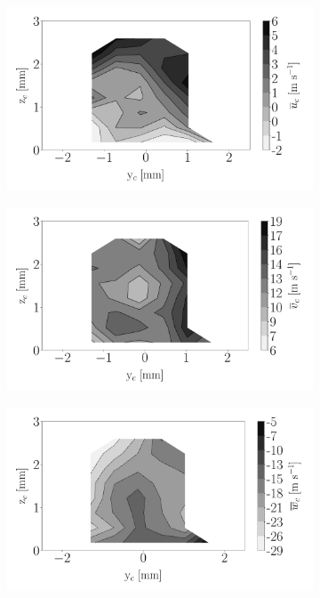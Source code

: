 \begin{figure}[h!]
\begin{subfigure}[b]{0.3\textwidth}
	\centering
   \includegraphics[scale=\scaleSLIBIMER]{./part3_applications/figures_ch8_resolved/injectors_SLI/dx10_xD06p67_ux_mean_map}
\end{subfigure}
   \hspace{0.17in}
\begin{subfigure}[b]{0.3\textwidth}
	\centering
   \includegraphics[scale=\scaleSLIBIMER]{./part3_applications/figures_ch8_resolved/injectors_SLI/dx10_xD06p67_uy_mean_map}
\end{subfigure}
   \hspace{0.17in}
\begin{subfigure}[b]{0.3\textwidth}
	\centering
   \includegraphics[scale=\scaleSLIBIMER]{./part3_applications/figures_ch8_resolved/injectors_SLI/dx10_xD06p67_uz_mean_map}

\end{subfigure}
\end{figure}
